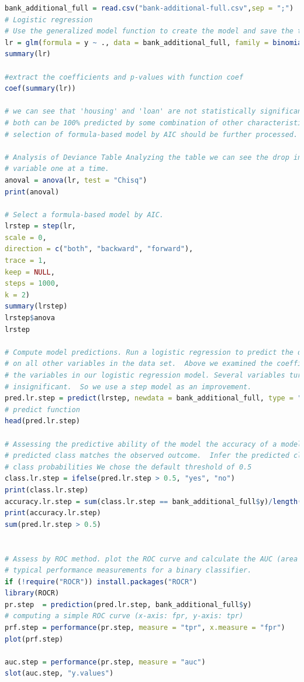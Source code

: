 \documentclass[12pt, a4paper, bibliography=totoc, english]{scrartcl}
\begin{document}
\begin{lstlisting}[language = R]
bank_additional_full = read.csv("bank-additional-full.csv",sep = ";")
# Logistic regression 
# Use the generalized model function to create the model and save the trained model as 'lr'.
lr = glm(formula = y ~ ., data = bank_additional_full, family = binomial(link = "logit"))
summary(lr)

#extract the coefficients and p-values with function coef
coef(summary(lr))

# we can see that 'housing' and 'loan' are not statistically significant. That means that they
# both can be 100% predicted by some combination of other characteristics.  However, the
# selection of formula-based model by AIC should be further processed.

# Analysis of Deviance Table Analyzing the table we can see the drop in deviance when adding each
# variable one at a time.
anoval = anova(lr, test = "Chisq")
print(anoval)

# Select a formula-based model by AIC.
lrstep = step(lr, 
scale = 0, 
direction = c("both", "backward", "forward"), 
trace = 1, 
keep = NULL, 
steps = 1000,
k = 2)
summary(lrstep)
lrstep$anova
lrstep

# Compute model predictions. Run a logistic regression to predict the dependent variable y based
# on all other variables in the data set.  Above we examined the coefficients and significance of
# the variables in our logistic regression model. Several variables turned out to be
# insignificant.  So we use a step model as an improvement.
pred.lr.step = predict(lrstep, newdata = bank_additional_full, type = "response")
# predict function
head(pred.lr.step)

# Assessing the predictive ability of the model the accuracy of a model describes how often the
# predicted class matches the observed outcome.  Infer the predicted class from the predicted
# class probabilities We chose the default threshold of 0.5
class.lr.step = ifelse(pred.lr.step > 0.5, "yes", "no")
print(class.lr.step)
accuracy.lr.step = sum(class.lr.step == bank_additional_full$y)/length(class.lr.step)
print(accuracy.lr.step)
sum(pred.lr.step > 0.5)


# Assess by ROC method. plot the ROC curve and calculate the AUC (area under the curve) which are
# typical performance measurements for a binary classifier.
if (!require("ROCR")) install.packages("ROCR")
library(ROCR)
pr.step  = prediction(pred.lr.step, bank_additional_full$y)
# computing a simple ROC curve (x-axis: fpr, y-axis: tpr)
prf.step = performance(pr.step, measure = "tpr", x.measure = "fpr")  
plot(prf.step)  

auc.step = performance(pr.step, measure = "auc")
slot(auc.step, "y.values")

\end{lstlisting}
\end{document}
